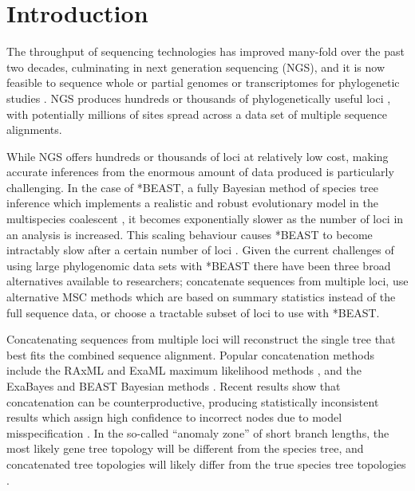 \documentclass[nogrid]{MBE}%
\begin{document}
\maketitle

\section{Introduction}

The throughput of sequencing technologies has improved many-fold over the past
two decades, culminating in next generation sequencing (NGS), and it is now
feasible to sequence whole or partial genomes or transcriptomes for phylogenetic
studies \citep{annurev-ecolsys-110512-135822}. NGS produces hundreds or
thousands of phylogenetically useful loci \citep[see for example][]{Blom056085},
with potentially millions of sites spread across a data set of multiple
sequence alignments.

\newpage

While NGS offers hundreds or thousands of loci at relatively low cost, making
accurate inferences from the enormous amount of data produced is particularly
challenging. In the case of *BEAST, a fully Bayesian method of species tree
inference which implements a realistic and robust evolutionary model in the
multispecies coalescent \citep[MSC;][]{Degnan2009332, Heled01032010}, it becomes exponentially
slower as the number of loci in an analysis is increased. This scaling behaviour
causes *BEAST to become intractably slow after a certain number of loci
\citep[the exact number will depend on the other parameters of the data set, see][]{Ogilvie01052016}.
Given the current challenges of using large phylogenomic data sets with *BEAST
there have been three broad alternatives available to researchers; concatenate
sequences from multiple loci, use alternative MSC methods which are based on
summary statistics instead of the full sequence data, or choose a tractable
subset of loci to use with *BEAST.

Concatenating sequences from multiple loci will reconstruct the single tree that
best fits the combined sequence alignment. Popular concatenation methods include
the RAxML and ExaML maximum likelihood methods \citep{Stamatakis01052014,
Kozlov01082015}, and the ExaBayes and BEAST Bayesian methods
\citep{Aberer01102014, Drummond2007}. Recent results show that concatenation
can be counterproductive, producing statistically inconsistent results which assign
high confidence to incorrect nodes due to model misspecification
\citep{NYAS:NYAS12747}. In the so-called ``anomaly zone'' of short branch
lengths, the most likely gene tree topology will be different from the species
tree, and concatenated tree topologies will likely differ from the true species
tree topologies \citep{journal.pgen.0020068, Kubatko01022007}.
\end{document}
